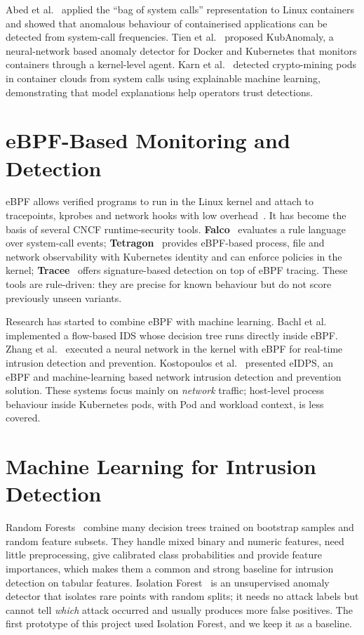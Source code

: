 Abed et al.~\cite{abed2015} applied the ``bag of system calls'' representation to Linux
containers and showed that anomalous behaviour of containerised applications can be
detected from system-call frequencies. Tien et al.~\cite{tien2019} proposed KubAnomaly,
a neural-network based anomaly detector for Docker and Kubernetes that monitors
containers through a kernel-level agent. Karn et al.~\cite{karn2021} detected
crypto-mining pods in container clouds from system calls using explainable machine
learning, demonstrating that model explanations help operators trust detections.

\section{eBPF-Based Monitoring and Detection}

eBPF allows verified programs to run in the Linux kernel and attach to tracepoints,
kprobes and network hooks with low overhead~\cite{gregg2019, ebpfio}. It has become the
basis of several CNCF runtime-security tools. \textbf{Falco}~\cite{falco} evaluates a
rule language over system-call events; \textbf{Tetragon}~\cite{tetragon} provides
eBPF-based process, file and network observability with Kubernetes identity and can
enforce policies in the kernel; \textbf{Tracee}~\cite{tracee} offers signature-based
detection on top of eBPF tracing. These tools are rule-driven: they are precise for
known behaviour but do not score previously unseen variants.

Research has started to combine eBPF with machine learning. Bachl et
al.~\cite{bachl2021} implemented a flow-based IDS whose decision tree runs directly
inside eBPF. Zhang et al.~\cite{zhang2024} executed a neural network in the kernel with
eBPF for real-time intrusion detection and prevention. Kostopoulos et
al.~\cite{kostopoulos2025} presented eIDPS, an eBPF and machine-learning based network
intrusion detection and prevention solution. These systems focus mainly on
\emph{network} traffic; host-level process behaviour inside Kubernetes pods, with Pod
and workload context, is less covered.

\section{Machine Learning for Intrusion Detection}

Random Forests~\cite{breiman2001} combine many decision trees trained on bootstrap
samples and random feature subsets. They handle mixed binary and numeric features,
need little preprocessing, give calibrated class probabilities and provide feature
importances, which makes them a common and strong baseline for intrusion detection on
tabular features. Isolation Forest~\cite{liu2008} is an unsupervised anomaly detector
that isolates rare points with random splits; it needs no attack labels but cannot tell
\emph{which} attack occurred and usually produces more false positives. The first
prototype of this project used Isolation Forest, and we keep it as a baseline.

